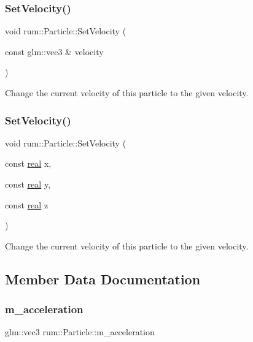 \subsubsection{\texorpdfstring{Set\+Velocity()}{SetVelocity()}\hspace{0.1cm}{\footnotesize\ttfamily [1/2]}}
{\footnotesize\ttfamily void rum\+::\+Particle\+::\+Set\+Velocity (\begin{DoxyParamCaption}\item[{const glm\+::vec3 \&}]{velocity }\end{DoxyParamCaption})}

Change the current velocity of this particle to the given velocity. \mbox{\label{classrum_1_1_particle_a481befad17e369f9ca7de3d60965a5d8}} 
\subsubsection{\texorpdfstring{Set\+Velocity()}{SetVelocity()}\hspace{0.1cm}{\footnotesize\ttfamily [2/2]}}
{\footnotesize\ttfamily void rum\+::\+Particle\+::\+Set\+Velocity (\begin{DoxyParamCaption}\item[{const \hyperlink{namespacerum_a7e8cca23573d5eaead0f138cbaa4862c}{real}}]{x,  }\item[{const \hyperlink{namespacerum_a7e8cca23573d5eaead0f138cbaa4862c}{real}}]{y,  }\item[{const \hyperlink{namespacerum_a7e8cca23573d5eaead0f138cbaa4862c}{real}}]{z }\end{DoxyParamCaption})}

Change the current velocity of this particle to the given velocity. 

\subsection{Member Data Documentation}
\mbox{\label{classrum_1_1_particle_aee85fab3a2d274ecc7d997f1c0c34132}} 
\subsubsection{\texorpdfstring{m\+\_\+acceleration}{m\_acceleration}}
{\footnotesize\ttfamily glm\+::vec3 rum\+::\+Particle\+::m\+\_\+acceleration\hspace{0.3cm}{\ttfamily [protected]}}

